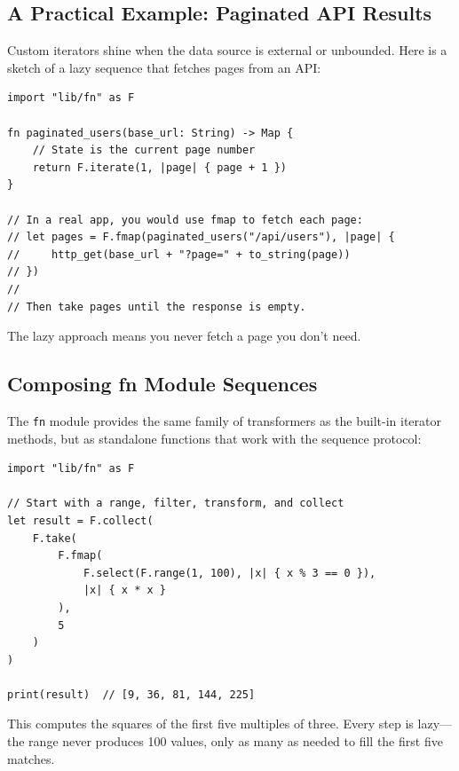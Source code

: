 \subsection{A Practical Example: Paginated API Results}\label{subsec:paginated-api}

Custom iterators shine when the data source is external or unbounded.
Here is a sketch of a lazy sequence that fetches pages from an API:

\begin{lstlisting}[language=Lattice, caption={Lazy pagination (conceptual)}]
import "lib/fn" as F

fn paginated_users(base_url: String) -> Map {
    // State is the current page number
    return F.iterate(1, |page| { page + 1 })
}

// In a real app, you would use fmap to fetch each page:
// let pages = F.fmap(paginated_users("/api/users"), |page| {
//     http_get(base_url + "?page=" + to_string(page))
// })
//
// Then take pages until the response is empty.
\end{lstlisting}

The lazy approach means you never fetch a page you don't need.

\subsection{Composing fn Module Sequences}\label{subsec:composing-fn-sequences}

The \lstinline|fn| module provides the same family of transformers as the built-in iterator methods, but as standalone functions that work with the sequence protocol:

\begin{lstlisting}[language=Lattice, caption={Composing sequences with the fn module}]
import "lib/fn" as F

// Start with a range, filter, transform, and collect
let result = F.collect(
    F.take(
        F.fmap(
            F.select(F.range(1, 100), |x| { x % 3 == 0 }),
            |x| { x * x }
        ),
        5
    )
)

print(result)  // [9, 36, 81, 144, 225]
\end{lstlisting}

This computes the squares of the first five multiples of three.
Every step is lazy---the range never produces 100 values, only as many as needed to fill the first five matches.


